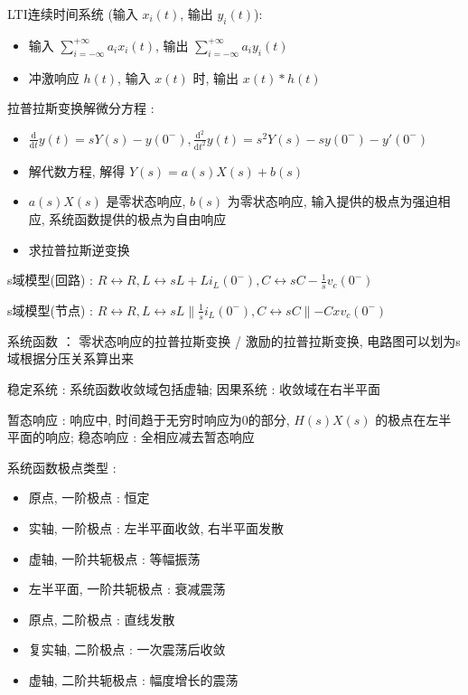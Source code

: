 \documentclass[UTF8, 12pt]{ctexart}
\begin{document}
	LTI连续时间系统 (输入 $ x_{i}(t) $, 输出 $ y_{i}(t) $):
	\begin{itemize}[leftmargin = 4em]
		\item 输入 $ \sum_{i=-\infty}^{+\infty}a_{i}x_{i}(t) $, 输出 $ \sum_{i=-\infty}^{+\infty}a_{i}y_{i}(t) $
		\item 冲激响应 $ h(t) $, 输入 $ x(t) $ 时, 输出 $ x(t)*h(t) $ 
	\end{itemize} 

	拉普拉斯变换解微分方程 :
	\begin{itemize}[leftmargin = 4em]
		\item $ \frac{\mathrm{d}}{\mathrm{d}t}y(t) = sY(s) - y(0^{-}), \frac{\mathrm{d}^{2}}{\mathrm{d}t^{2}}y(t) = s^{2}Y(s) - sy(0^{-}) - y'(0^{-}) $
		\item 解代数方程, 解得 $ Y(s) = a(s)X(s) + b(s) $
		\item $ a(s)X(s) $ 是零状态响应, $ b(s) $ 为零状态响应, 输入提供的极点为强迫相应, 系统函数提供的极点为自由响应
		\item 求拉普拉斯逆变换
	\end{itemize}

	s域模型(回路) : $ R \leftrightarrow R, L \leftrightarrow sL + Li_{L}(0^{-}), C \leftrightarrow sC - \frac{1}{s}v_{c}(0^{-}) $

	s域模型(节点) : $ R \leftrightarrow R, L \leftrightarrow sL \parallel \frac{1}{s}i_{L}(0^{-}), C \leftrightarrow sC \parallel -Cxv_{c}(0^{-}) $

	系统函数 ： 零状态响应的拉普拉斯变换 / 激励的拉普拉斯变换, 电路图可以划为s域根据分压关系算出来

	稳定系统 : 系统函数收敛域包括虚轴; 因果系统 : 收敛域在右半平面

	暂态响应 : 响应中, 时间趋于无穷时响应为0的部分, $ H(s)X(s) $ 的极点在左半平面的响应; 稳态响应 : 全相应减去暂态响应

	系统函数极点类型 :
	\begin{itemize}[leftmargin = 4em]
		\item 原点, 一阶极点 : 恒定
		\item 实轴, 一阶极点 : 左半平面收敛, 右半平面发散
		\item 虚轴, 一阶共轭极点 : 等幅振荡
		\item 左半平面, 一阶共轭极点 : 衰减震荡
		\item 原点, 二阶极点 : 直线发散
		\item 复实轴, 二阶极点 : 一次震荡后收敛
		\item 虚轴, 二阶共轭极点 : 幅度增长的震荡 
	\end{itemize}
\end{document}
